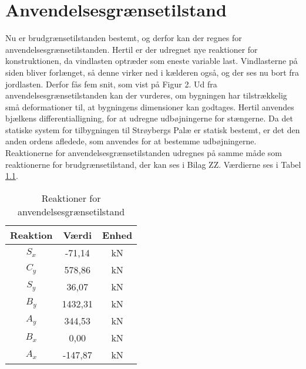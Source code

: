 \chapter{Anvendelsesgrænsetilstand}
Nu er brudgrænsetilstanden bestemt, og derfor kan der regnes for anvendelsesgrænsetilstanden. Hertil er der udregnet nye reaktioner for konstruktionen, da vindlasten optræder som eneste variable last. Vindlasterne på siden bliver forlænget, så denne virker ned i kælderen også, og der ses nu bort fra jordlasten. Derfor fås fem snit, som vist på Figur 2. Ud fra anvendelsesgrænsetilstanden kan der vurderes, om bygningen har tilstrækkelig små deformationer til, at bygningens dimensioner kan godtages. Hertil anvendes bjælkens differentialligning, for at udregne udbøjningerne for stængerne. Da det statiske system for tilbygningen til Strøybergs Palæ er statisk bestemt, er det den anden ordens afledede, som anvendes for at bestemme udbøjningerne. Reaktionerne for anvendelsesgrænsetilstanden udregnes på samme måde som reaktionerne for brudgrænsetilstand, der kan ses i Bilag ZZ. Værdierne ses i Tabel \ref{tab:anden}.
\begin{table}
	\begin{center}
		\begin{tabular}{|c|c|c|}
			\hline
			Reaktion & Værdi & Enhed \\ \hline
			$S_x$ & -71,14 		& kN      \\ \hline
			$C_y$ & 578,86 		& kN      \\ \hline
			$S_y$ & 36,07 		& kN       \\ \hline
			$B_y$ & 1432,31 	& kN      \\ \hline
			$A_y$ & 344,53 		& kN      \\ \hline
			$B_x$ & 0,00 		& kN      \\ \hline
			$A_x$ & -147,87 	& kN       \\ \hline
		\end{tabular}
		\caption{Reaktioner for anvendelsesgrænsetilstand}
		\label{tab:anden}
	\end{center}
\end{table}

